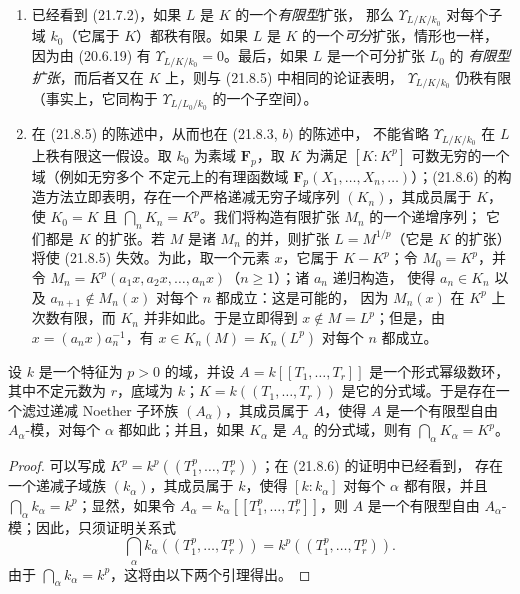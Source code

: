 \begin{remarks}[21.8.7]
\label{0.21.8.7-fr}
\begin{enumerate}
  \item[(i)] 已经看到 (21.7.2)，如果 $L$ 是 $K$ 的一个\emph{有限型}扩张，
  那么 $\Upsilon_{L/K/k_0}$ 对每个子域 $k_0$（它属于 $K$）都秩有限。如果 $L$
  是 $K$ 的一个\emph{可分}扩张，情形也一样，因为由 (20.6.19) 有
  $\Upsilon_{L/K/k_0}=0$。最后，如果 $L$ 是一个可分扩张 $L_0$ 的
  \emph{有限型扩张}，而后者又在 $K$ 上，则与 (21.8.5) 中相同的论证表明，
  $\Upsilon_{L/K/k_0}$ 仍秩有限（事实上，它同构于
  $\Upsilon_{L/L_0/k_0}$ 的一个子空间）。

  \item[(ii)] 在 (21.8.5) 的陈述中，从而也在 (21.8.3, $b)$ 的陈述中，
  不能省略 $\Upsilon_{L/K/k_0}$ 在 $L$ 上秩有限这一假设。取 $k_0$ 为素域
  $\mathbf F_p$，取 $K$ 为满足 $[K:K^p]$ 可数无穷的一个域（例如无穷多个
  不定元上的有理函数域 $\mathbf F_p(X_1,\ldots,X_n,\ldots)$）；(21.8.6)
  的构造方法立即表明，存在一个严格递减无穷子域序列 $(K_n)$，其成员属于 $K$，
  使 $K_0=K$ 且 $\bigcap_nK_n=K^p$。我们将构造有限扩张 $M_n$ 的一个递增序列；
  它们都是 $K$ 的扩张。若 $M$ 是诸 $M_n$ 的并，则扩张 $L=M^{1/p}$（它是
  $K$ 的扩张）将使 (21.8.5)
  失效。为此，取一个元素 $x$，它属于 $K-K^p$；令 $M_0=K^p$，并令
  $M_n=K^p(a_1x,a_2x,\ldots,a_nx)$（$n\geqslant1$）；诸 $a_n$ 递归构造，
  使得 $a_n\in K_n$ 以及 $a_{n+1}\notin M_n(x)$ 对每个 $n$ 都成立：这是可能的，
  因为 $M_n(x)$ 在 $K^p$ 上次数有限，而 $K_n$ 并非如此。于是立即得到
  $x\notin M=L^p$；但是，由 $x=(a_nx)a_n^{-1}$，有
  $x\in K_n(M)=K_n(L^p)$ 对每个 $n$ 都成立。
\end{enumerate}
\end{remarks}

\begin{proposition}[21.8.8]
\label{0.21.8.8-fr}
设 $k$ 是一个特征为 $p>0$ 的域，并设
$A=k[[T_1,\ldots,T_r]]$ 是一个形式幂级数环，其中不定元数为 $r$，底域为
$k$；$K=k((T_1,\ldots,T_r))$ 是它的分式域。于是存在一个滤过递减
Noether 子环族 $(A_\alpha)$，其成员属于 $A$，使得 $A$ 是一个有限型自由
$A_\alpha$-模，对每个 $\alpha$ 都如此；并且，如果 $K_\alpha$ 是 $A_\alpha$ 的分式域，则有
$\bigcap_\alpha K_\alpha=K^p$。
\end{proposition}

\begin{proof}
可以写成 $K^p=k^p((T_1^p,\ldots,T_r^p))$；在 (21.8.6) 的证明中已经看到，
存在一个递减子域族 $(k_\alpha)$，其成员属于 $k$，使得
$[k:k_\alpha]$ 对每个 $\alpha$ 都有限，并且 $\bigcap_\alpha k_\alpha=k^p$；显然，如果令
$A_\alpha=k_\alpha[[T_1^p,\ldots,T_r^p]]$，则 $A$ 是一个有限型自由
$A_\alpha$-模；因此，只须证明关系式
\begin{equation}
\tag{21.8.8.1}
\label{0.21.8.8.1-fr}
  \bigcap_\alpha k_\alpha((T_1^p,\ldots,T_r^p))
  =k^p((T_1^p,\ldots,T_r^p)).
\end{equation}
由于 $\bigcap_\alpha k_\alpha=k^p$，这将由以下两个引理得出。
\end{proof}

